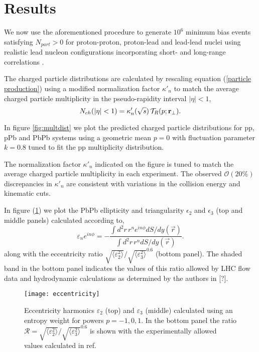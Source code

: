 \documentclass[aps,prl,reprint,amsmath,nofootinbib]{revtex4-1}
\begin{document}
\section{Results}

We now use the aforementioned procedure to generate $10^6$ minimum bias events satisfying $N_{part} > 0$ for
proton-proton, proton-lead and lead-lead nuclei using realistic lead nucleon configurations incorporating
short- and long-range correlations \cite{nucleon-correlations}.

The charged particle distributions are calculated by rescaling equation (\ref{particle production}) using a
modified normalization factor $\kappa'_n$ to match the average charged particle multiplicity in the
pseudo-rapidity interval $|\eta| < 1$,
\begin{equation}
  N_{ch}(|\eta|<1) = \kappa'_n(\sqrt{s})\, \mathcal{T}_R(p;{\bf r}_\perp).
\end{equation}

In figure \ref{fig:multdist} we plot the predicted charged particle distributions for pp, pPb and PbPb systems
using a geometric mean $p=0$ with fluctuation parameter $k=0.8$ tuned to fit the pp multiplicity
distribution.

The normalization factor $\kappa'_n$ indicated on the figure is tuned to match the average charged particle
multiplicity in each experiment. The observed $\mathcal{O}(20\%)$ discrepancies in $\kappa'_n$ are consistent
with variations in the collision energy and kinematic cuts.

In figure (\ref{fig:eccen}) we plot the PbPb ellipticity and triangularity $\epsilon_2$ and $\epsilon_3$ (top
and middle panels) calculated according to,
\begin{equation}
  \varepsilon_n e^{i n\phi} = -\frac{\int d^2r\, r^n e^{i n \phi} dS/dy(\vec{r})}{\int d^2r\, r^n dS/dy(\vec{r})}.
\end{equation}
along with the eccentricity ratio $\sqrt{\langle \varepsilon_2^2 \rangle}/\sqrt{\langle \varepsilon_3^2
\rangle}^{0.6}$ (bottom panel). The shaded band in the bottom panel indicates the values of this ratio allowed
by LHC flow data and hydrodynamic calculations as determined by the authors in [?].

\begin{figure}[t]
  \texttt{[image: eccentricity]}
  \caption{\label{fig:eccen}Eccentricity harmonics $\varepsilon_2$ (top) and $\varepsilon_3$ (middle)
  calculated using an entropy weight for powers $p=-1,0,1$.  In the bottom panel the ratio $\mathcal{R} =
  \sqrt{\langle \varepsilon_2^2 \rangle}/\sqrt{\langle \varepsilon_3^2 \rangle}^{0.6}$ is shown with the
  experimentally allowed values calculated in ref.\ \cite{constraining-ic}}
\end{figure}
\end{document}
